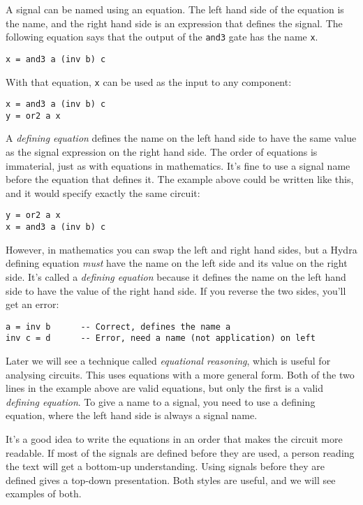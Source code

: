 \documentclass[11pt]{article}
\begin{document}
A signal can be named using an equation.  The left hand side of the
equation is the name, and the right hand side is an expression that
defines the signal.  The following equation says that the output of
the \texttt{and3} gate has the name \texttt{x}.

\begin{verbatim}
x = and3 a (inv b) c
\end{verbatim}

With that equation, \texttt{x} can be used as the input to any component:

\begin{verbatim}
x = and3 a (inv b) c
y = or2 a x
\end{verbatim}

A \emph{defining equation} defines the name on the left hand side to have
the same value as the signal expression on the right hand side. The
order of equations is immaterial, just as with equations in
mathematics.  It's fine to use a signal name before the equation that
defines it.  The example above could be written like this, and it
would specify exactly the same circuit:

\begin{verbatim}
y = or2 a x
x = and3 a (inv b) c
\end{verbatim}

However, in mathematics you can swap the left and right hand sides,
but a Hydra defining equation \emph{must} have the name on the left side
and its value on the right side.  It's called a \emph{defining equation}
because it defines the name on the left hand side to have the value of
the right hand side.  If you reverse the two sides, you'll get an
error:

\begin{verbatim}
a = inv b      -- Correct, defines the name a
inv c = d      -- Error, need a name (not application) on left
\end{verbatim}

Later we will see a technique called \emph{equational reasoning}, which is
useful for analysing circuits.  This uses equations with a more
general form. Both of the two lines in the example above are valid
equations, but only the first is a valid \emph{defining equation}.  To give
a name to a signal, you need to use a defining equation, where the
left hand side is always a signal name.

It's a good idea to write the equations in an order that makes the
circuit more readable.  If most of the signals are defined before they
are used, a person reading the text will get a bottom-up
understanding.  Using signals before they are defined gives a top-down
presentation.  Both styles are useful, and we will see examples of
both.
\end{document}
